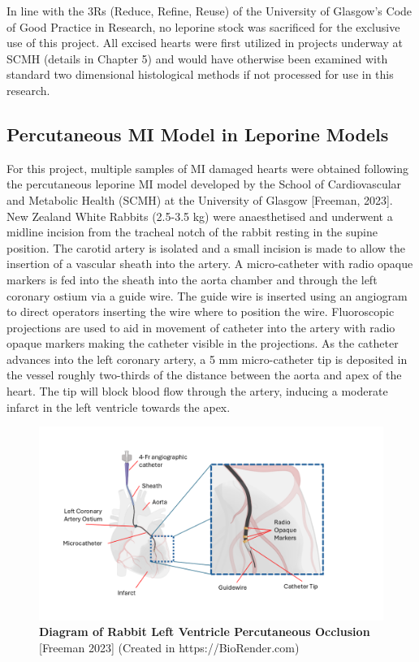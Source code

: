 In line with the 3Rs (Reduce, Refine, Reuse) of the University of Glasgow's Code of Good Practice in Research, no leporine stock was sacrificed for the exclusive use of this project. All excised hearts were first utilized in projects underway at SCMH (details in Chapter 5) and would have otherwise been examined with standard two dimensional histological methods if not processed for use in this research.


\subsection{Percutaneous MI Model in Leporine Models}
For this project, multiple samples of MI damaged hearts were obtained following the percutaneous leporine MI model developed by the School of Cardiovascular and Metabolic Health (SCMH) at the University of Glasgow [Freeman, 2023]. New Zealand White Rabbits (2.5-3.5 kg) were anaesthetised and underwent a midline incision from the tracheal notch of the rabbit resting in the supine position. The carotid artery is isolated and a small incision is made to allow the insertion of a vascular sheath into the artery. A micro-catheter with radio opaque markers is fed into the sheath into the aorta chamber and through the left coronary ostium via a guide wire. The guide wire is inserted using an angiogram to direct operators inserting the wire where to position the wire. Fluoroscopic projections are used to aid in movement of catheter into the artery with radio opaque markers making the catheter visible in the projections. As the catheter advances into the left coronary artery, a 5 mm micro-catheter tip is deposited in the vessel roughly two-thirds of the distance between the aorta and apex of the heart. The tip will block blood flow through the artery, inducing a moderate infarct in the left ventricle towards the apex.  

\begin{figure}[ht]
    \centering
    \includegraphics[width=1\linewidth]{Figures/Figure2_2.png}
    \caption{\textbf{Diagram of Rabbit Left Ventricle Percutaneous Occlusion} [Freeman 2023] (Created in  https://BioRender.com)}
    \label{fig:enter-label}
\end{figure}

